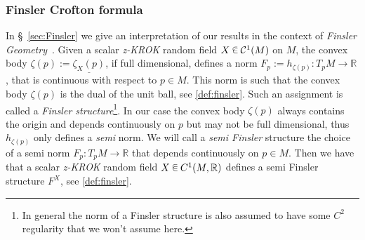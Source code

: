 \documentclass[AHL, Unicode, longabstracts, published]{cedram}
\newcommand{\R}{\mathbb{R}}
\newcommand{\mC}{\mathcal{C}}
\newcommand{\seg}{\underline}
\newcommand{\zkrok}{\emph{z-KROK}\xspace}
\newcommand*\randin{
\mathchoice {\raisebox{-.35ex}{$\displaystyle{^\subset}$}\mkern-11.5mu\raisebox{+.45ex}{$\displaystyle{_\subset}$}} {\mkern+1mu\raisebox{-.27ex}{$\textstyle{^\subset}$}\mkern-11.7mu\raisebox{+.45ex}{$\textstyle{_\subset}$}} {\raisebox{.35ex}{$\scriptstyle\subset$}\mkern-14mu\raisebox{-.15ex}{$\scriptstyle\subset$}} {\raisebox{.3ex}{$\scriptscriptstyle\subset$}\mkern-13.5mu\raisebox{-.10ex}{$\scriptscriptstyle\subset$}}}
\begin{document}
\subsubsection{Finsler Crofton formula}

In \S~\ref{sec:Finsler} we give an interpretation of our results in the context of \emph{Finsler Geometry}~\cite{introRiemannFinsler}. Given a scalar \zkrok random field $X\,\randin\, \mC^1(M)$ on $M$, the convex body $\zeta(p):=\seg{\zeta_X(p)}$, if full dimensional, defines a norm $F_p:=h_{\zeta(p)}:T_pM\to\R$, that is continuous with respect to $p\in M$. This norm is such that the convex body $\zeta(p)$ is the dual of the unit ball, see \cref{def:finsler}. Such an assignment is called a \emph{Finsler structure}\footnote{In general the norm of a Finsler structure is also assumed to have some $C^2$ regularity that we won't assume here.}. In our case the convex body $\zeta(p)$ always contains the origin and depends continuously on $p$ but may not be full dimensional, thus $h_{\zeta(p)}$ only defines a \emph{semi} norm. We will call a \emph{semi Finsler} structure the choice of a semi norm $F_p:T_pM\to\R$ that depends continuously on $p\in M$. Then we have that a scalar \zkrok random field $X\,\randin\, C^1(M,\R)$ defines a semi Finsler structure $F^X$, see \cref{def:finsler}.
\end{document}
